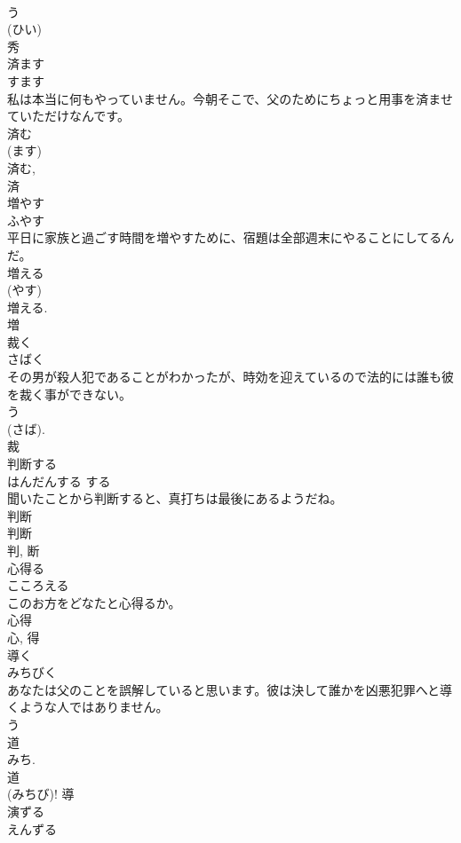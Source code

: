 \documentclass[8pt]{extreport}
\begin{document}
\begin{CJK}{UTF8}{min}
\\	う 
\\	(ひい) 
\\	秀	
\\	済ます	
\\	すます	
\\	私は本当に何もやっていません。今朝そこで、父のためにちょっと用事を済ませていただけなんです。	
\\	済む 
\\	(ます) 
\\	済む, 
\\	済	
\\	増やす	
\\	ふやす	
\\	平日に家族と過ごす時間を増やすために、宿題は全部週末にやることにしてるんだ。	
\\	増える 
\\	(やす) 
\\	増える. 
\\	増	
\\	裁く	
\\	さばく	
\\	その男が殺人犯であることがわかったが、時効を迎えているので法的には誰も彼を裁く事ができない。	
\\	う 
\\	(さば). 
\\	裁	
\\	判断する	
\\	はんだんする	する 
\\	聞いたことから判断すると、真打ちは最後にあるようだね。	
\\	判断 
\\	判断 
\\	判, 断	
\\	心得る	
\\	こころえる	
\\	このお方をどなたと心得るか。	
\\	心得 
\\	心, 得	
\\	導く	
\\	みちびく	
\\	あなたは父のことを誤解していると思います。彼は決して誰かを凶悪犯罪へと導くような人ではありません。	
\\	う 
\\	道 
\\	みち. 
\\	道 
\\	(みちび)!	導	
\\	演ずる	
\\	えんずる	

\end{CJK}
\end{document}
